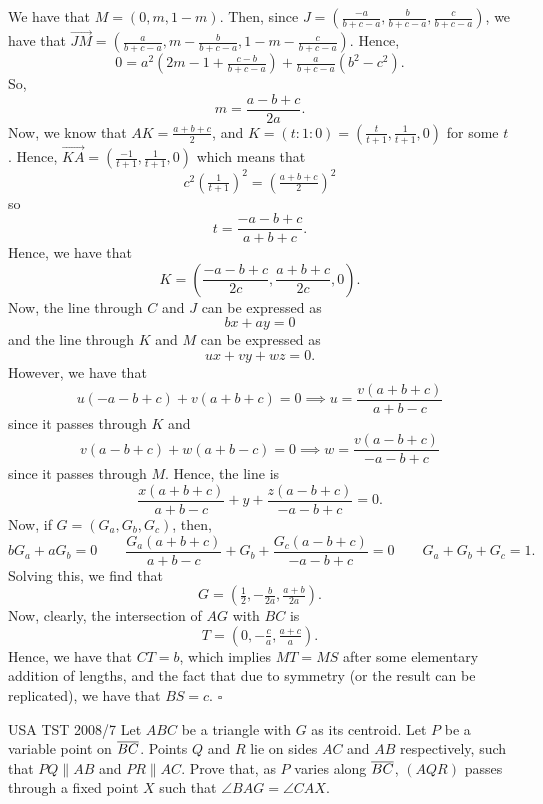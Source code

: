 \documentclass{article}
\begin{document}
We have that $M = (0, m, 1-m)$. Then, since $J = \left(\tfrac{-a}{b+c-a}, \tfrac{b}{b+c-a}, \tfrac{c}{b+c-a}\right)$, we have that $\overrightarrow{JM} = \left(\tfrac{a}{b+c-a}, m-\tfrac{b}{b+c-a}, 1-m-\tfrac{c}{b+c-a}\right)$. Hence, \[0 = a^2\left(2m-1+\tfrac{c-b}{b+c-a}\right)+\tfrac{a}{b+c-a}(b^2-c^2).\] So, \[m = \dfrac{a-b+c}{2a}.\] Now, we know that $AK = \tfrac{a+b+c}{2}$, and $K = (t : 1 : 0) = \left(\tfrac{t}{t+1}, \tfrac{1}{t+1}, 0\right)$ for some $t$. Hence, $\overrightarrow{KA} = \left(\tfrac{-1}{t+1}, \tfrac{1}{t+1}, 0\right)$ which means that \[c^2\left(\tfrac{1}{t+1}\right)^2 = \left(\tfrac{a+b+c}{2}\right)^2\] so \[t = \dfrac{-a-b+c}{a+b+c}.\] Hence, we have that \[K = \left(\dfrac{-a-b+c}{2c}, \dfrac{a+b+c}{2c}, 0\right).\] Now, the line through $C$ and $J$ can be expressed as \[bx+ay = 0\] and the line through $K$ and $M$ can be expressed as \[ux+vy+wz = 0.\] However, we have that \[u(-a-b+c)+v(a+b+c) = 0 \implies u = \dfrac{v(a+b+c)}{a+b-c}\] since it passes through $K$ and \[v(a-b+c)+w(a+b-c) = 0 \implies w = \dfrac{v(a-b+c)}{-a-b+c}\] since it passes through $M$. Hence, the line is \[\dfrac{x(a+b+c)}{a+b-c}+y+\dfrac{z(a-b+c)}{-a-b+c} = 0.\] Now, if $G = (G_a, G_b, G_c)$, then, \[bG_a+aG_b = 0 \qquad \dfrac{G_a(a+b+c)}{a+b-c}+G_b+\dfrac{G_c(a-b+c)}{-a-b+c} = 0 \qquad G_a+G_b+G_c = 1.\] Solving this, we find that \[G = \left(\tfrac{1}{2}, -\tfrac{b}{2a}, \tfrac{a+b}{2a}\right).\] Now, clearly, the intersection of $AG$ with $BC$ is \[T = \left(0, -\tfrac{c}{a}, \tfrac{a+c}{a}\right).\] Hence, we have that $CT = b$, which implies $MT=MS$ after some elementary addition of lengths, and the fact that due to symmetry (or the result can be replicated), we have that $BS = c$. $\square$

\begin{problem}[7.38]{USA TST 2008/7}
Let $ABC$ be a triangle with $G$ as its centroid. Let $P$ be a variable point on $\overline{BC}$. Points $Q$ and $R$ lie on sides $AC$ and $AB$ respectively, such that $PQ \parallel AB$ and $PR \parallel AC$. Prove that, as $P$ varies along $\overline{BC}$, $(AQR)$ passes through a fixed point $X$ such that $\angle BAG = \angle CAX$. 
\end{problem}
\end{document}
